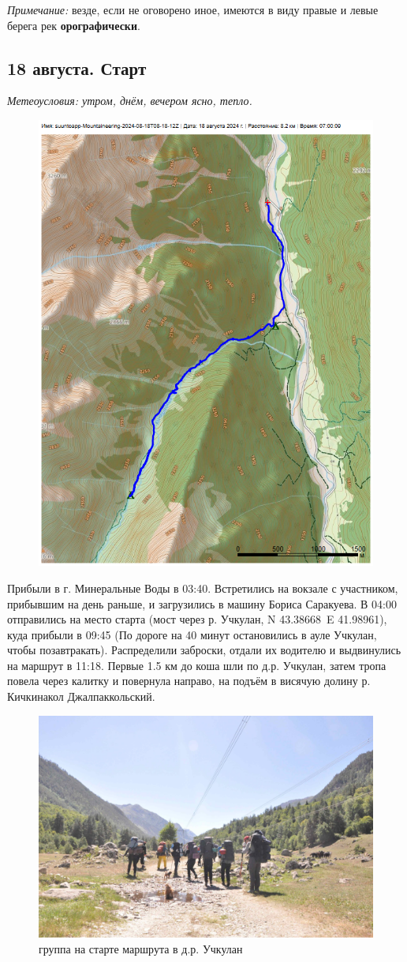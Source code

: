 \textit{Примечание:} везде, если не оговорено иное, имеются в виду правые и левые берега рек \textbf{орографически}.
\subsection{18 августа. Старт}
\textit{Метеоусловия: утром, днём, вечером ясно, тепло.}

\begin{figure}[h!]
	\centering
	\includegraphics[angle=0, width=0.7\linewidth]{../pics/mini_maps/18}
	\label{fig:mini_18}
\end{figure}


Прибыли в г. Минеральные Воды в 03:40. Встретились на вокзале с участником, прибывшим на день раньше, и загрузились в машину Бориса Саракуева. В 04:00 отправились на место старта (мост через р. Учкулан, N 43.38668\degree~E 41.98961\degree), куда прибыли в 09:45 (По дороге на 40 минут остановились в ауле Учкулан, чтобы позавтракать). Распределили заброски, отдали их водителю и выдвинулись на маршрут в 11:18. Первые 1.5 км до коша шли по д.р. Учкулан, затем тропа повела через калитку и повернула направо, на подъём в висячую долину р. Кичкинакол Джалпаккольский.

\begin{figure}[h!]
	\centering
	\includegraphics[width=0.7\linewidth]{../pics/DSC_0412}
	\caption{группа на старте маршрута в д.р. Учкулан}
	\label{fig:uchkulan}
\end{figure}


